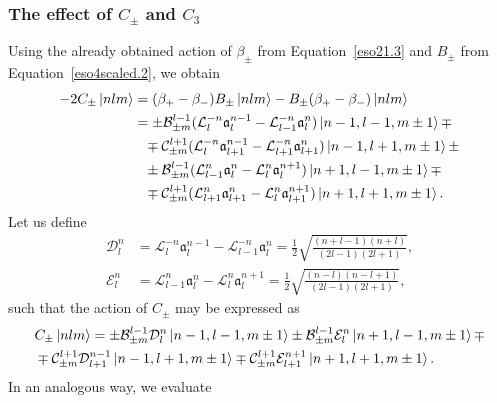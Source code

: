 \documentclass[12pt,a4paper]{report}
\theoremstyle{definition}
\theoremstyle{remark}
\theoremstyle{remark}
\begin{document}
\subsubsection{The effect of $C_\pm$ and $C_3$}
Using the already obtained action of $\beta_\pm$ from Equation~\ref{eso21.3} and $B_\pm$ from Equation~\ref{eso4scaled.2}, we obtain
\begin{align*}
-2C_\pm\ket{nlm}&=(\beta_+-\beta_-)B_\pm\ket{nlm}-B_\pm(\beta_+-\beta_-)\ket{nlm}\\
&=\pm\mathcal{B}_{\pm m}^{l-1}(\mathcal{L}_l^{-n}\mathfrak{a}_l^{n-1}-\mathcal{L}_{l-1}^{-n}\mathfrak{a}_l^n)\ket{n-1,l-1,m\pm 1}\mp\\
&\phantom{=}\mp \mathcal{C}_{\pm m}^{l+1}(\mathcal{L}_{l}^{-n}\mathfrak{a}_{l+1}^{n-1}-\mathcal{L}_{l+1}^{-n}\mathfrak{a}_{l+1}^{n})\ket{n-1,l+1,m\pm 1}\pm\\
&\phantom{=}\pm \mathcal{B}_{\pm m}^{l-1}(\mathcal{L}_{l-1}^{n}\mathfrak{a}_l^{n}-\mathcal{L}_{l}^{n}\mathfrak{a}_l^{n+1})\ket{n+1,l-1,m\pm 1}\mp\\
&\phantom{=}\mp \mathcal{C}_{\pm m}^{l+1}(\mathcal{L}_{l+1}^{n}\mathfrak{a}_{l+1}^{n}-\mathcal{L}_{l}^{n}\mathfrak{a}_{l+1}^{n+1})\ket{n+1,l+1,m\pm 1}.
\end{align*}
Let us define
\begin{equation}\label{eso41.4}
\begin{aligned}
\mathcal{D}_l^n&=\mathcal{L}_l^{-n}\mathfrak{a}_l^{n-1}-\mathcal{L}_{l-1}^{-n}\mathfrak{a}_l^n=\frac{1}{2}\sqrt{\frac{(n+l-1)(n+l)}{(2l-1)(2l+1)}},\\
\mathcal{E}_l^n&=\mathcal{L}_{l-1}^{n}\mathfrak{a}_l^{n}-\mathcal{L}_{l}^{n}\mathfrak{a}_l^{n+1}=\frac{1}{2}\sqrt{\frac{(n-l)(n-l+1)}{(2l-1)(2l+1)}},
\end{aligned}
\end{equation}
such that the action of $C_\pm$ may be expressed as
\begin{equation}\label{eso41.5}
\begin{aligned}
&C_\pm\ket{nlm}=\pm\mathcal{B}_{\pm m}^{l-1}\mathcal{D}_l^n\ket{n-1,l-1,m\pm 1}\pm \mathcal{B}_{\pm m}^{l-1}\mathcal{E}_l^n\ket{n+1,l-1,m\pm 1}\mp\\
&\mp \mathcal{C}_{\pm m}^{l+1}\mathcal{D}_{l+1}^{n-1}\ket{n-1,l+1,m\pm 1}\mp\mathcal{C}_{\pm m}^{l+1}\mathcal{E}_{l+1}^{n+1}\ket{n+1,l+1,m\pm 1}.
\end{aligned}
\end{equation}
In an analogous way, we evaluate
\end{document}

